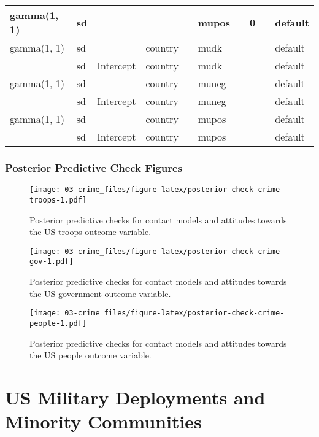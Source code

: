 \documentclass[
]{book}
\theoremstyle{definition}
\theoremstyle{definition}
\theoremstyle{definition}
\theoremstyle{definition}
\theoremstyle{remark}
\begin{document}
\begin{table}
\begin{tabular}[t]{l|l|l|l|l|l|l|l|l|l}
\hline
gamma(1, 1) & sd &  &  &  & mupos &  & 0 &  & default\\
\hline
gamma(1, 1) & sd &  & country &  & mudk &  &  &  & default\\
\hline
 & sd & Intercept & country &  & mudk &  &  &  & default\\
\hline
gamma(1, 1) & sd &  & country &  & muneg &  &  &  & default\\
\hline
 & sd & Intercept & country &  & muneg &  &  &  & default\\
\hline
gamma(1, 1) & sd &  & country &  & mupos &  &  &  & default\\
\hline
 & sd & Intercept & country &  & mupos &  &  &  & default\\
\hline
\end{tabular}
\end{table}

\hypertarget{posterior-predictive-check-figures-1}{%
\subsection{Posterior Predictive Check Figures}\label{posterior-predictive-check-figures-1}}

\begin{figure}
\centering
\texttt{[image: 03-crime\_files/figure-latex/posterior-check-crime-troops-1.pdf]}
\caption{\label{fig:posterior-check-crime-troops}Posterior predictive checks for contact models and attitudes towards the US troops outcome variable.}
\end{figure}

\begin{figure}
\centering
\texttt{[image: 03-crime\_files/figure-latex/posterior-check-crime-gov-1.pdf]}
\caption{\label{fig:posterior-check-crime-gov}Posterior predictive checks for contact models and attitudes towards the US government outcome variable.}
\end{figure}

\begin{figure}
\centering
\texttt{[image: 03-crime\_files/figure-latex/posterior-check-crime-people-1.pdf]}
\caption{\label{fig:posterior-check-crime-people}Posterior predictive checks for contact models and attitudes towards the US people outcome variable.}
\end{figure}

\hypertarget{us-military-deployments-and-minority-communities}{%
\chapter{US Military Deployments and Minority Communities}\label{us-military-deployments-and-minority-communities}}
\end{document}
